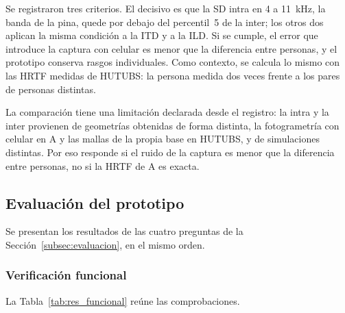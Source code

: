Se registraron tres criterios. El decisivo es que la SD intra en 4 a 11~kHz, la banda de la pina, quede por debajo del percentil~5 de la inter; los otros dos aplican la misma condición a la ITD y a la ILD. Si se cumple, el error que introduce la captura con celular es menor que la diferencia entre personas, y el prototipo conserva rasgos individuales. Como contexto, se calcula lo mismo con las HRTF medidas de HUTUBS: la persona medida dos veces frente a los pares de personas distintas.

La comparación tiene una limitación declarada desde el registro: la intra y la inter provienen de geometrías obtenidas de forma distinta, la fotogrametría con celular en A y las mallas de la propia base en HUTUBS, y de simulaciones distintas. Por eso responde si el ruido de la captura es menor que la diferencia entre personas, no si la HRTF de A es exacta.



\subsection{Evaluación del prototipo}
\label{subsec:res_evaluacion}

Se presentan los resultados de las cuatro preguntas de la Sección~\ref{subsec:evaluacion}, en el mismo orden.

\subsubsection{Verificación funcional}
\label{subsubsec:res_funcional}

La Tabla~\ref{tab:res_funcional} reúne las comprobaciones.

